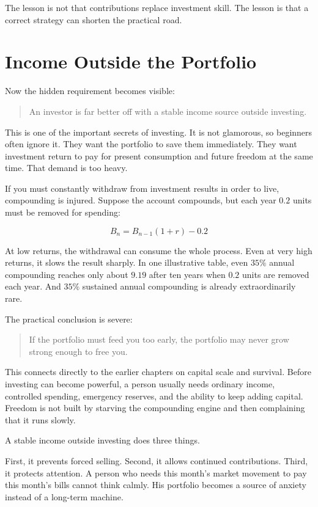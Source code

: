 The lesson is not that contributions replace investment skill. The lesson is that a correct strategy can shorten the practical road.

\section*{Income Outside the Portfolio}

Now the hidden requirement becomes visible:

\begin{quote}
An investor is far better off with a stable income source outside investing.
\end{quote}

This is one of the important secrets of investing. It is not glamorous, so beginners often ignore it. They want the portfolio to save them immediately. They want investment return to pay for present consumption and future freedom at the same time. That demand is too heavy.

If you must constantly withdraw from investment results in order to live, compounding is injured. Suppose the account compounds, but each year \(0.2\) units must be removed for spending:

\[
B_n=B_{n-1}(1+r)-0.2
\]

At low returns, the withdrawal can consume the whole process. Even at very high returns, it slows the result sharply. In one illustrative table, even \(35\%\) annual compounding reaches only about \(9.19\) after ten years when \(0.2\) units are removed each year. And \(35\%\) sustained annual compounding is already extraordinarily rare.

The practical conclusion is severe:

\begin{quote}
If the portfolio must feed you too early, the portfolio may never grow strong enough to free you.
\end{quote}

This connects directly to the earlier chapters on capital scale and survival. Before investing can become powerful, a person usually needs ordinary income, controlled spending, emergency reserves, and the ability to keep adding capital. Freedom is not built by starving the compounding engine and then complaining that it runs slowly.

A stable income outside investing does three things.

First, it prevents forced selling. Second, it allows continued contributions. Third, it protects attention. A person who needs this month's market movement to pay this month's bills cannot think calmly. His portfolio becomes a source of anxiety instead of a long-term machine.

